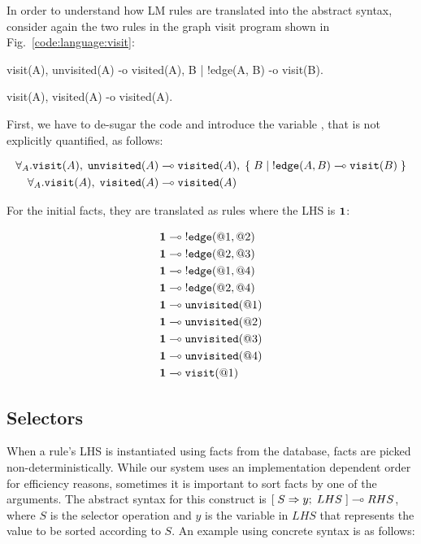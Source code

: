 In order to understand how LM rules are translated into the abstract syntax,
consider again the two rules in the graph visit program shown in
Fig.~\ref{code:language:visit}:

\nopagebreak

\begin{Code}
visit(A),
unvisited(A)
   -o visited(A),
      {B | !edge(A, B) -o visit(B)}.

visit(A),
visited(A)
   -o visited(A).
\end{Code}

First, we have to de-sugar the code and introduce the variable , that is
not explicitly quantified, as follows:

\nopagebreak

\begin{align}
\forall_A. \mathtt{visit}(A), \; \mathtt{unvisited}(A) \multimap & \;
\mathtt{visited}(A), \; \{ \; B \; | \; {!}\mathtt{edge}(A, B) \multimap \mathtt{visit}(B) \; \}\\
\forall_A. \mathtt{visit}(A), \; \mathtt{visited}(A) \multimap & \;
\mathtt{visited}(A)
\end{align}

For the initial facts, they are translated as rules where the LHS is $\mathbf{1}$:

\nopagebreak

\begin{align}
\mathbf{1} \multimap \; & {!} \mathtt{edge}(@1, @2) \\
\mathbf{1} \multimap \; & {!} \mathtt{edge}(@2, @3) \\
\mathbf{1} \multimap \; & {!} \mathtt{edge}(@1, @4) \\
\mathbf{1} \multimap \; & {!} \mathtt{edge}(@2, @4) \\
\mathbf{1} \multimap \; & \mathtt{unvisited}(@1)  \\
\mathbf{1} \multimap \; & \mathtt{unvisited}(@2) \\
\mathbf{1} \multimap \; & \mathtt{unvisited}(@3) \\
\mathbf{1} \multimap \; & \mathtt{unvisited}(@4) \\
\mathbf{1} \multimap \; & \mathtt{visit}(@1)
\end{align}

\subsection{Selectors}\label{section:language:selector}

When a rule's LHS is instantiated using facts from the database, facts are
picked non-deterministically. While our system uses an implementation dependent
order for efficiency reasons, sometimes it is important to sort facts by one of
the arguments. The abstract syntax for this construct is
$[\; S \Rightarrow y; \; LHS \;] \multimap RHS$, where $S$ is the selector operation and $y$ is the
variable in $LHS$ that represents the value to be sorted according to $S$. An
example using concrete syntax is as follows:

